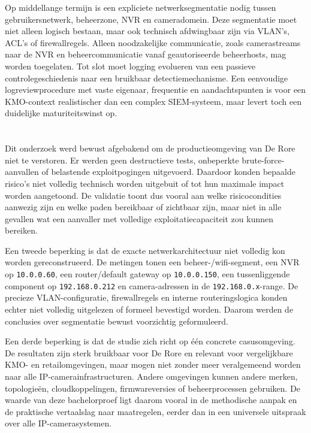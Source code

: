 Op middellange termijn is een expliciete netwerksegmentatie nodig tussen gebruikersnetwerk, beheerzone, NVR en cameradomein. Deze segmentatie moet niet alleen logisch bestaan, maar ook technisch afdwingbaar zijn via VLAN's, ACL's of firewallregels. Alleen noodzakelijke communicatie, zoals camerastreams naar de NVR en beheercommunicatie vanaf geautoriseerde beheerhosts, mag worden toegelaten. Tot slot moet logging evolueren van een passieve controlegeschiedenis naar een bruikbaar detectiemechanisme. Een eenvoudige logreviewprocedure met vaste eigenaar, frequentie en aandachtspunten is voor een KMO-context realistischer dan een complex SIEM-systeem, maar levert toch een duidelijke maturiteitswinst op.

\section{}%
\label{sec:conclusie-beperkingen}

Dit onderzoek werd bewust afgebakend om de productieomgeving van De Rore niet te verstoren. Er werden geen destructieve tests, onbeperkte brute-force-aanvallen of belastende exploitpogingen uitgevoerd. Daardoor konden bepaalde risico's niet volledig technisch worden uitgebuit of tot hun maximale impact worden aangetoond. De validatie toont dus vooral aan welke risicocondities aanwezig zijn en welke paden bereikbaar of zichtbaar zijn, maar niet in alle gevallen wat een aanvaller met volledige exploitatiecapaciteit zou kunnen bereiken.

Een tweede beperking is dat de exacte netwerkarchitectuur niet volledig kon worden gereconstrueerd. De metingen tonen een beheer-/wifi-segment, een NVR op \texttt{10.0.0.60}, een router/default gateway op \texttt{10.0.0.150}, een tussenliggende component op \texttt{192.168.0.212} en camera-adressen in de \texttt{192.168.0.x}-range. De precieze VLAN-configuratie, firewallregels en interne routeringslogica konden echter niet volledig uitgelezen of formeel bevestigd worden. Daarom werden de conclusies over segmentatie bewust voorzichtig geformuleerd.

Een derde beperking is dat de studie zich richt op één concrete casusomgeving. De resultaten zijn sterk bruikbaar voor De Rore en relevant voor vergelijkbare KMO- en retailomgevingen, maar mogen niet zonder meer veralgemeend worden naar alle IP-camerainfrastructuren. Andere omgevingen kunnen andere merken, topologieën, cloudkoppelingen, firmwareversies of beheerprocessen gebruiken. De waarde van deze bachelorproef ligt daarom vooral in de methodische aanpak en de praktische vertaalslag naar maatregelen, eerder dan in een universele uitspraak over alle IP-camerasystemen.

